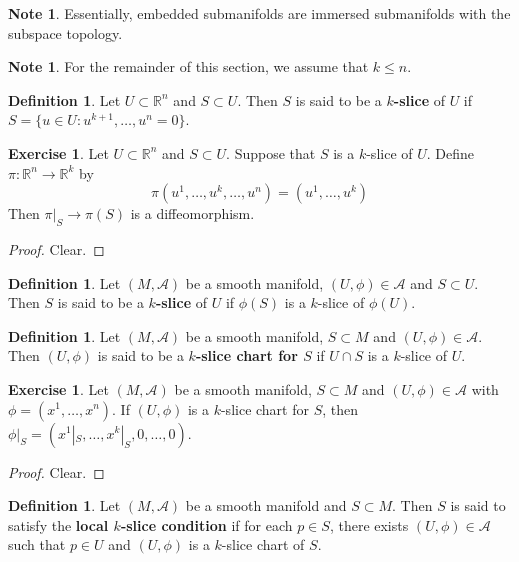 \documentclass{book}
\theoremstyle{definition}
\newtheorem{defn}[definition]{Definition}
\newtheorem{note}[definition]{Note}
\newtheorem{ex}[definition]{Exercise}
\newcommand{\R}{\mathbb{R}}
\newcommand{\MA}{\mathcal{A}}
\DeclareMathOperator*{\0}{\mbf{0}}
\DeclareMathOperator*{\1}{\mbf{1}}
\newcommand{\tbf}[1]{\textbf{#1}}
\begin{document}
	\begin{note}
	Essentially, embedded submanifolds are immersed submanifolds with the subspace topology.
	\end{note}
	
	\begin{note}
	For the remainder of this section, we assume that $k \leq n$.
	\end{note}
	
	\begin{defn}
	Let $U \subset \R^n$ and $S \subset U$. Then $S$ is said to be a \tbf{$k$-slice} of $U$ if $S = \{u \in U: u^{k+1}, \dots, u^{n} = 0\}$.
	\end{defn}	
	
	\begin{ex}
	Let $U \subset \R^n$ and $S \subset U$. Suppose that $S$ is a $k$-slice of $U$. Define $\pi: \R^n \rightarrow \R^k$ by $$\pi(u^1, \dots, u^k, \dots, u^n) = (u^1, \dots, u^k)$$ Then $\pi|_{S} \rightarrow \pi(S)$ is a diffeomorphism.
	\end{ex}	
	
	\begin{proof}
	Clear.
	\end{proof}
	
	\begin{defn}
	Let $(M, \MA)$ be a smooth manifold, $(U, \phi) \in \MA$ and $S \subset U$. Then $S$ is said to be a \tbf{$k$-slice} of $U$ if $\phi(S)$ is a $k$-slice of $\phi(U)$.
	\end{defn}	
	
	\begin{defn}
	Let $(M, \MA)$ be a smooth manifold, $S \subset M$ and $(U, \phi) \in \MA$. Then $(U, \phi)$ is said to be a \tbf{$k$-slice chart for $S$} if $U \cap S$ is a $k$-slice of $U$.
	\end{defn}	
	
	\begin{ex}
	Let $(M, \MA)$ be a smooth manifold, $S \subset M$ and $(U, \phi) \in \MA$ with $\phi = (x^1, \dots, x^n)$. If $(U, \phi)$ is a $k$-slice chart for $S$, then $\phi|_S = (x^1|_S, \dots, x^k|_S, 0, \dots, 0)$.
	\end{ex}
	
	\begin{proof}
	Clear. 
	\end{proof}
	
	\begin{defn}
	Let $(M, \MA)$ be a smooth manifold and $S \subset M$. Then $S$ is said to satisfy the \tbf{local $k$-slice condition} if for each $p \in S$, there exists $(U, \phi) \in \MA$ such that $p \in U$ and $(U, \phi)$ is a $k$-slice chart of $S$.
	\end{defn}
	
\end{document}
